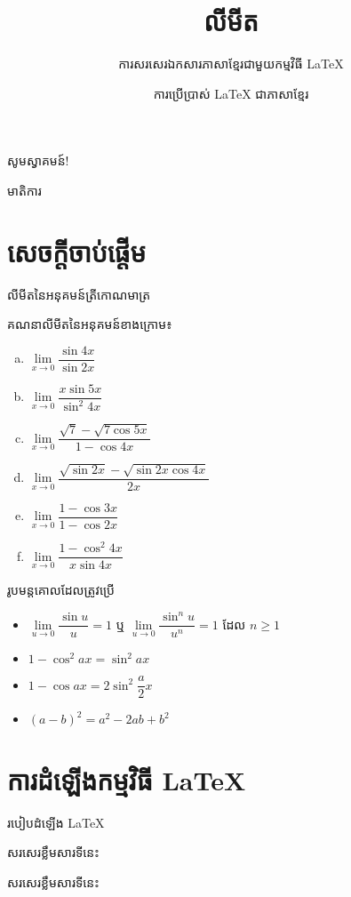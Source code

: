 \documentclass{beamer}
\title{លីមីត}
\subtitle[\LaTeX]{ការសរសេរឯកសារភាសាខ្មែរជាមួយកម្មវិធី \LaTeX}
\author[ស៊ុំ សំអុន]{ការប្រើប្រាស់ \LaTeX{} ជាភាសាខ្មែរ}
\institute{វិទ្យាស្ថានបច្ចេកវិទ្យាកម្ពុជា​}
\begin{document}
	\begin{frame}{សូមស្វាគមន៍!}
		\titlepage
	\end{frame}
	\begin{frame}{មាតិការ}
		\tableofcontents
	\end{frame}
	\section{សេចក្តីចាប់ផ្ដើម}
	\begin{frame}{លីមីតនៃអនុគមន៍ត្រីកោណមាត្រ}
		\begin{block}{គណនាលីមីតនៃអនុគមន៍ខាងក្រោម៖}
		\begin{multicols}{2}
			\begin{enumerate}[a)]
				\item $ \lim\limits_{x\to 0} \dfrac{\sin4x}{\sin2x} $
				\item $ \lim\limits_{x\to 0} \dfrac{x\sin5x}{\sin^2 4x} $
				\item $ \lim\limits_{x\to 0} \dfrac{\sqrt{7}-\sqrt{7\cos5x}}{1-\cos4x} $
				\item $ \lim\limits_{x\to 0} \dfrac{\sqrt{\sin2x}-\sqrt{\sin2x \cos4x}}{2x} $
				\item $ \lim\limits_{x\to 0} \dfrac{1-\cos3x}{1-\cos2x} $
				\item $ \lim\limits_{x\to 0} \dfrac{1-\cos^2 4x}{x\sin4x} $
			\end{enumerate}
		\end{multicols}
		\end{block}
		\begin{block}{រូបមន្តគោលដែលត្រូវប្រើ}
			\begin{itemize}
				\item $ \lim\limits_{u\to 0} \dfrac{\sin u}{u}=1$ ឬ $  \lim\limits_{u\to 0} \dfrac{\sin^n u}{u^n}=1 $ ដែល $ n\geq1 $
				\item $ 1-\cos^2 ax=\sin^2 ax $
				\item $ 1-\cos ax=2\sin^2 \dfrac{a}{2}x $
				\item $ \left(a-b\right)^2 = a^2 -2ab +b^2$
			\end{itemize}
		\end{block}
\end{frame}
%
	\section{ការដំឡើងកម្មវិធី \LaTeX{}}
	\begin{frame}{របៀបដំឡើង \LaTeX{}}
		\begin{definition}[កម្មវិធី \LaTeX{}]
			សរសេរខ្លឹមសារទីនេះ
		\end{definition}
		\begin{example}[ការណែនាំ]
		សរសេរខ្លឹមសារទីនេះ
		\end{example}
	\end{frame}
\end{document}
